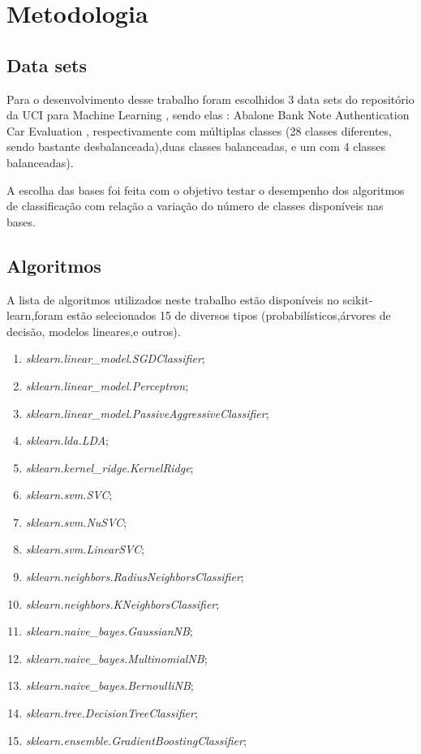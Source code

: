 \documentclass[11pt]{article}
\begin{document}
\section{Metodologia}

\subsection{Data sets}
Para o desenvolvimento desse trabalho foram escolhidos 3 data sets do repositório da UCI para Machine Learning \cite{uci}, sendo elas : Abalone\cite{abalone} Bank Note Authentication \cite{banknote} Car Evaluation \cite{cardata}, respectivamente com múltiplas classes (28 classes diferentes, sendo bastante desbalanceada),duas classes balanceadas, e um com 4 classes balanceadas).

A escolha das bases foi feita com o objetivo testar o desempenho dos algoritmos de classificação com relação a variação do número de classes disponíveis nas bases.

\subsection{Algoritmos}  
 A lista de algoritmos utilizados neste trabalho estão disponíveis no scikit-learn\cite{scikitlearn},foram estão selecionados 15 de diversos tipos (probabilísticos,árvores de decisão, modelos lineares,e outros).
 \begin{enumerate}
    \item \textit{sklearn.linear\_model.SGDClassifier};
    \item \textit{sklearn.linear\_model.Perceptron};
    \item \textit{sklearn.linear\_model.PassiveAggressiveClassifier};
    \item \textit{sklearn.lda.LDA};
    \item \textit{sklearn.kernel\_ridge.KernelRidge};
    \item \textit{sklearn.svm.SVC};
    \item \textit{sklearn.svm.NuSVC};
    \item \textit{sklearn.svm.LinearSVC};
    \item \textit{sklearn.neighbors.RadiusNeighborsClassifier};
    \item \textit{sklearn.neighbors.KNeighborsClassifier};
    \item \textit{sklearn.naive\_bayes.GaussianNB};
    \item \textit{sklearn.naive\_bayes.MultinomialNB};
    \item \textit{sklearn.naive\_bayes.BernoulliNB};
    \item \textit{sklearn.tree.DecisionTreeClassifier};
    \item \textit{sklearn.ensemble.GradientBoostingClassifier};
 \end{enumerate}      
\end{document}
